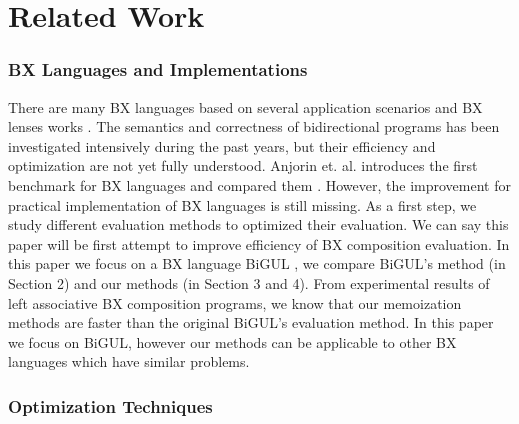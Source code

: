\section{Related Work}

\subsubsection*{BX Languages and Implementations}

There are many BX languages \cite{Buchmann:2018:BFI:3362232.3362263,Ko:2016:BFV:2847538.2847544,LeblebiciAS14,Samimi-Dehkordi18,Cicchetti2011,Hinkel:2019:CPB:3318595.3318634}
based on several application scenarios and BX lenses works \cite{Bohannon06relationallenses:, Bohannon:2008:BRL:1328438.1328487}. The semantics and correctness of bidirectional programs has been investigated intensively during the past years, but their efficiency and optimization are not yet fully understood. Anjorin et. al. introduces the first benchmark for BX languages and compared them \cite{Anjorin2019}. However, the improvement for practical implementation of BX languages is still missing. As a first step, we study different evaluation methods to optimized their evaluation. We can say this paper will be first attempt to improve efficiency of BX composition evaluation. In this paper we focus on a BX language BiGUL \cite{Ko:2016:BFV:2847538.2847544, Ko:2017:ABB:3177123.3158129}, we compare BiGUL's method (in Section 2) and our methods (in Section 3 and 4). From experimental results of left associative BX composition programs, we know that our memoization methods are faster than the original BiGUL's evaluation method.
In this paper we focus on BiGUL, however our methods can be applicable to other BX languages which have similar problems.


\subsubsection*{Optimization Techniques}

